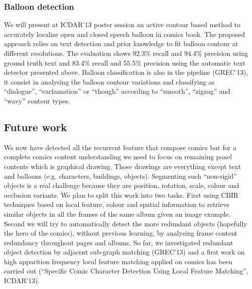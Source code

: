 \documentclass[final,12pt]{report} 						%
\begin{document}
\subsubsection{Balloon detection}
We will present at ICDAR'13 poster session an active contour based method to accurately localize open and closed speech balloon in comics book. The proposed approach relies on text detection and prior knowledge to fit balloon contour at different resolutions. The evaluation shows 92.3\% recall and 94.4\% precision using ground truth text and 83.4\% recall and 55.5\% precision using the automatic text detector presented above. Balloon classification is also in the pipeline (GREC'13), it consist in analysing the balloon contour variations and classifying as ``dialogue'', ``exclamation'' or ``though'' according to ``smooth'', ``zigzag'' and ``wavy'' contour types.

\subsection{Future work}
We now have detected all the recurrent feature that compose comics but for a complete comics content understanding we need to focus on remaining panel contents which is graphical drawing. Those drawings are everything except text and balloons (e.g. characters, buildings, objects). Segmenting such ``non-rigid'' objects is a real challenge because they are position, rotation, scale, colour and occlusion variants. We plan to split this work into two tasks. First using CBIR techniques based on local feature, colour and spatial information to retrieve similar objects in all the frames of the same album given an image example. Second we will try to automatically detect the more redundant objects (hopefully the hero of the comics), without previous learning, by analysing frame content redundancy throughout pages and albums. So far, we investigated redundant object detection by adjacent sub-graph matching (GREC'13) and a first work on high apparition frequency local feature matching applied on comics has been carried out (``Specific Comic Character Detection Using Local Feature Matching'', ICDAR'13).



\end{document}
